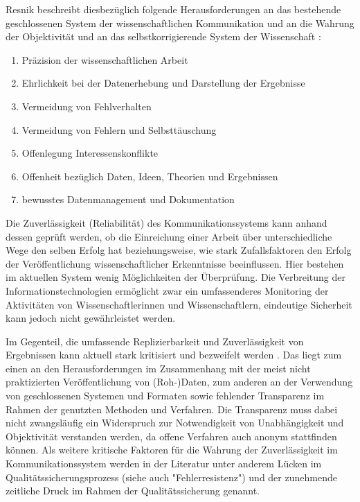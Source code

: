 Resnik beschreibt diesbezüglich folgende Herausforderungen an das bestehende geschlossenen System der wissenschaftlichen Kommunikation und an die Wahrung der Objektivität und an das selbstkorrigierende System der Wissenschaft \cite{resnik_2005_ethics}:
\begin{enumerate}
\item Präzision der wissenschaftlichen Arbeit
\item Ehrlichkeit bei der Datenerhebung und Darstellung der Ergebnisse
\item Vermeidung von Fehlverhalten
\item Vermeidung von Fehlern und Selbsttäuschung
\item Offenlegung Interessenskonflikte
\item Offenheit bezüglich Daten, Ideen, Theorien und  Ergebnissen
\item bewusstes Datenmanagement und Dokumentation
\end{enumerate}

Die Zuverlässigkeit (Reliabilität) des Kommunikationssystems kann anhand dessen geprüft werden, ob die Einreichung einer Arbeit über unterschiedliche Wege den selben Erfolg hat beziehungsweise, wie stark Zufallsfaktoren den Erfolg der Veröffentlichung wissenschaftlicher Erkenntnisse beeinflussen. Hier bestehen im aktuellen System wenig Möglichkeiten der Überprüfung. Die Verbreitung der Informationstechnologien ermöglicht zwar ein umfassenderes Monitoring der Aktivitäten von Wissenschaftlerinnen und Wissenschaftlern, eindeutige Sicherheit kann jedoch nicht gewährleistet werden.

Im Gegenteil, die umfassende Replizierbarkeit und Zuverlässigkeit von Ergebnissen kann aktuell stark kritisiert und bezweifelt werden \cite{Luescher_2014}. Das liegt zum einen an den Herausforderungen im Zusammenhang mit der meist nicht praktizierten Veröffentlichung von (Roh-)Daten, zum anderen an der Verwendung von geschlossenen Systemen und Formaten sowie fehlender Transparenz im Rahmen der genutzten Methoden und Verfahren. Die Transparenz muss dabei nicht zwangsläufig ein Widerspruch zur Notwendigkeit von Unabhängigkeit und Objektivität verstanden werden, da offene Verfahren auch anonym stattfinden können. Als weitere kritische Faktoren für die Wahrung der Zuverlässigkeit im Kommunikationssystem werden in der Literatur unter anderem Lücken im Qualitätssicherungsprozess (siehe auch "Fehlerresistenz") \cite{bar_2009_wissenschaftliche} und der zunehmende zeitliche Druck im Rahmen der Qualitätssicherung \cite{Luescher_2014} genannt.

